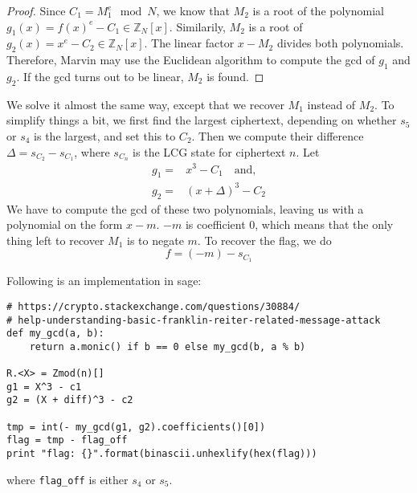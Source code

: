 \documentclass[12pt]{article}
\newtheorem{proof}{Proof}
\begin{document}
\begin{proof}
Since $C_{1} = M^{e}_{1} \mod N$, we know that $M_{2}$ is a root of the polynomial $g_{1}(x) = f(x)^{e} - C_{1} \in \mathbb{Z}_{N}[x]$. Similarily, $M_{2}$ is a root of $g_{2}(x) = x^{e} - C_{2} \in \mathbb{Z}_{N}[x]$. The linear factor $x - M_{2}$ divides both polynomials. Therefore, Marvin may use the Euclidean algorithm to compute the gcd of $g_{1}$ and $g_{2}$. If the gcd turns out to be linear, $M_{2}$ is found.
\end{proof}

We solve it almost the same way, except that we recover $M_{1}$ instead of $M_{2}$. To simplify things a bit, we first find the largest ciphertext, depending on whether $s_{5}$ or $s_{4}$ is the largest, and set this to $C_{2}$. Then we compute their difference $\Delta = s_{C_{2}} - s_{C_{1}}$, where $s_{C_{n}}$ is the LCG state for ciphertext $n$. Let
\begin{equation}
\begin{aligned}
	g_{1} = & x^{3} - C_{1} \quad \text{and,} \\
	g_{2} = & (x + \Delta)^{3} - C_{2}
\end{aligned}
\end{equation}
We have to compute the gcd of these two polynomials, leaving us with a polynomial on the form $x - m$. $-m$ is coefficient 0, which means that the only thing left to recover $M_{1}$ is to negate $m$. To recover the flag, we do
\begin{equation}
	f = (-m) - s_{C_{1}}
\end{equation}

Following is an implementation in sage:
\begin{verbatim}
# https://crypto.stackexchange.com/questions/30884/
# help-understanding-basic-franklin-reiter-related-message-attack
def my_gcd(a, b):
	return a.monic() if b == 0 else my_gcd(b, a % b)

R.<X> = Zmod(n)[]
g1 = X^3 - c1
g2 = (X + diff)^3 - c2

tmp = int(- my_gcd(g1, g2).coefficients()[0])
flag = tmp - flag_off
print "flag: {}".format(binascii.unhexlify(hex(flag)))
\end{verbatim}
where \texttt{flag\_off} is either $s_{4}$ or $s_{5}$.

\printbibliography
\end{document}
